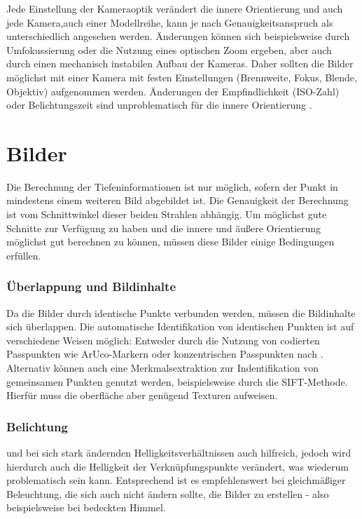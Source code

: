 \documentclass[a4paper,12pt,bibliography=totoc, listof=totoc,titlepage]{scrreprt}
\begin{document}
Jede Einstellung der Kameraoptik verändert die innere Orientierung und auch jede Kamera,auch einer Modellreihe, kann je nach Genauigkeitsanspruch als unterschiedlich angesehen werden. Änderungen können sich beispielsweise durch Umfokussierung oder die Nutzung eines optischen Zoom ergeben, aber auch durch einen mechanisch instabilen Aufbau der Kameras. Daher sollten die Bilder möglichst mit einer Kamera mit festen Einstellungen (Brennweite, Fokus, Blende, Objektiv) aufgenommen werden. Änderungen der Empfindlichkeit (ISO-Zahl) oder Belichtungszeit sind unproblematisch für die innere Orientierung \citep[S. 176]{luhmann}.


\section{Bilder}
\label{s:bilder}

Die Berechnung der Tiefeninformationen ist nur möglich, sofern der Punkt in mindestens einem weiteren Bild abgebildet ist. Die Genauigkeit der Berechnung ist vom Schnittwinkel dieser beiden Strahlen abhängig. Um möglichst gute Schnitte zur Ver\-fügung zu haben und die innere und äußere Orientierung möglichst gut berechnen zu können, müssen diese Bilder einige Bedingungen erfüllen.

\subsubsection{Überlappung und Bildinhalte}
Da die Bilder durch identische Punkte verbunden werden, müssen die Bildinhalte sich überlappen. Die automatische Identifikation von identischen Punkten ist auf verschiedene Weisen möglich: Entweder durch die Nutzung von codierten Passpunkten wie ArUco-Markern oder konzentrischen Passpunkten nach \cite{schneider}. Alternativ können auch eine Merkmalsextraktion zur Indentifikation von gemeinsamen Punkten genutzt werden, beispielsweise durch die SIFT-Methode. Hierfür muss die oberfläche aber genügend Texturen aufweisen. \citep[S. 478]{luhmann}

\subsubsection{Belichtung}
und bei sich stark ändernden Helligkeitsverhältnissen auch hilfreich, jedoch wird hierdurch auch die Helligkeit der Verknüpfungspunkte verändert, was wiederum problematisch sein kann. Entsprechend ist es empfehlenswert bei gleichmäßiger Beleuchtung, die sich auch nicht ändern sollte, die Bilder zu erstellen - also beispielsweise bei bedeckten Himmel.
\end{document}
